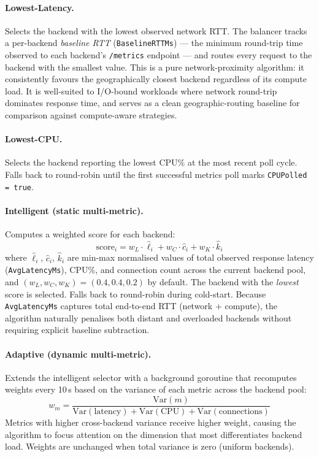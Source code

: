 \documentclass[12pt]{article}
\begin{document}
\paragraph{Lowest-Latency.}
Selects the backend with the lowest observed network RTT. The balancer tracks
a per-backend \emph{baseline RTT} (\texttt{BaselineRTTMs}) --- the minimum
round-trip time observed to each backend's \texttt{/metrics} endpoint ---
and routes every request to the backend with the smallest value. This is a
pure network-proximity algorithm: it consistently favours the geographically
closest backend regardless of its compute load. It is well-suited to I/O-bound
workloads where network round-trip dominates response time, and serves as a
clean geographic-routing baseline for comparison against compute-aware strategies.

\paragraph{Lowest-CPU.}
Selects the backend reporting the lowest CPU\% at the most recent poll cycle.
Falls back to round-robin until the first successful metrics poll marks
\texttt{CPUPolled = true}.

\paragraph{Intelligent (static multi-metric).}
Computes a weighted score for each backend:
\[
  \text{score}_i = w_L \cdot \hat{\ell}_i + w_C \cdot \hat{c}_i + w_K \cdot \hat{k}_i
\]
where $\hat{\ell}_i$, $\hat{c}_i$, $\hat{k}_i$ are min-max normalised
values of total observed response latency (\texttt{AvgLatencyMs}), CPU\%,
and connection count across the current backend pool,
and $(w_L, w_C, w_K) = (0.4, 0.4, 0.2)$ by default.
The backend with the \textit{lowest} score is selected. Falls back to
round-robin during cold-start. Because \texttt{AvgLatencyMs} captures
total end-to-end RTT (network $+$ compute), the algorithm naturally
penalises both distant and overloaded backends without requiring explicit
baseline subtraction.

\paragraph{Adaptive (dynamic multi-metric).}
Extends the intelligent selector with a background goroutine that recomputes
weights every 10\,s based on the variance of each metric across the backend
pool:
\[
  w_m = \frac{\text{Var}(m)}{\text{Var}(\text{latency}) +
             \text{Var}(\text{CPU}) + \text{Var}(\text{connections})}
\]
Metrics with higher cross-backend variance receive higher weight, causing the
algorithm to focus attention on the dimension that most differentiates backend
load. Weights are unchanged when total variance is zero (uniform backends).
\end{document}
